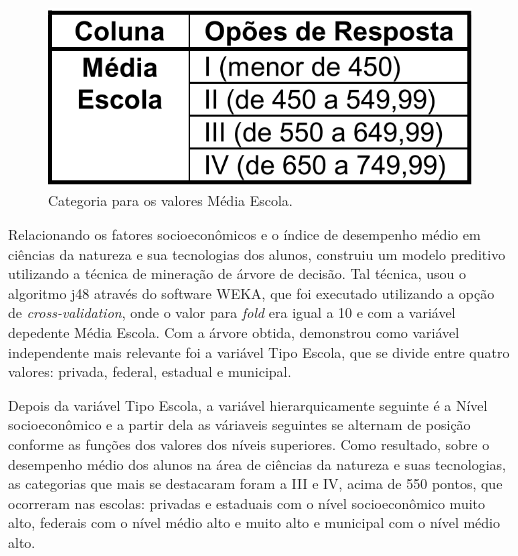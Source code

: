 \begin{figure}[!htp]
	\begin{center}
    \caption{\label{fig:waveform_fig} Categoria para os valores Média Escola.}
	\includegraphics[scale=0.50]{Figuras/Tabela_ENEM_2.png}
	\end{center}
\end{figure}

\par
Relacionando os fatores socioeconômicos e o índice de desempenho médio em ciências da natureza e sua tecnologias dos alunos,  construiu um modelo preditivo utilizando a técnica de mineração de árvore de decisão. Tal técnica, usou o algoritmo j48 através do software WEKA, que foi executado utilizando a opção de \textit{cross-validation}, onde o valor para \textit{fold} era igual a 10 e com a variável depedente Média Escola. Com a árvore obtida, demonstrou como variável independente mais relevante foi a variável Tipo Escola, que se divide entre quatro valores: privada, federal, estadual e municipal.


\par
Depois da variável Tipo Escola, a variável hierarquicamente seguinte é a Nível socioeconômico e a partir dela as váriaveis seguintes se alternam de posição conforme as funções dos valores dos níveis superiores. Como resultado, sobre o desempenho médio dos alunos na área de ciências da natureza e suas tecnologias, as categorias que mais se destacaram foram a III e IV, acima de 550 pontos, que ocorreram nas escolas: privadas e estaduais com o nível socioeconômico muito alto, federais com o nível médio alto e muito alto e municipal com o nível médio alto.

